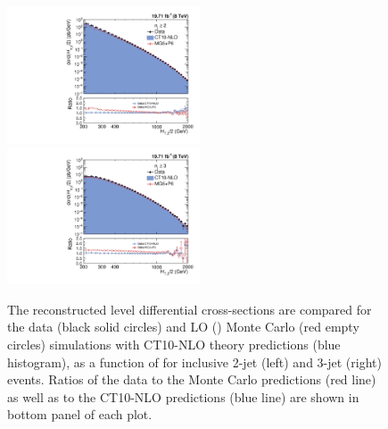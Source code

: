 \begin{figure}[!htbp]
 \begin{center}
 \hspace*{-5mm}\includegraphics[width=0.51\textwidth]{Plots_HT_2_150/Comparison_all_2_HT_2_150.pdf}%
 ~~\includegraphics[width=0.51\textwidth]{Plots_HT_2_150/Comparison_all_3_HT_2_150.pdf}
 \caption[Comparison of differential cross-sections for the data with simulated events and CT10-NLO theory predictions.]{The reconstructed level differential cross-sections are compared for the data (black solid circles) and LO \MadGraphFn\plusn \PYTHIAS (\MGP) Monte Carlo (red empty circles) simulations with CT10-NLO theory predictions (blue histogram), as a function of \httwo for inclusive 2-jet (left) and 3-jet (right) events. Ratios of the data to the Monte Carlo predictions (red line) as well as to the CT10-NLO predictions (blue line) are shown in bottom panel of each plot.}
 \label{fig:comp_all}
 \end{center}
\end{figure}

